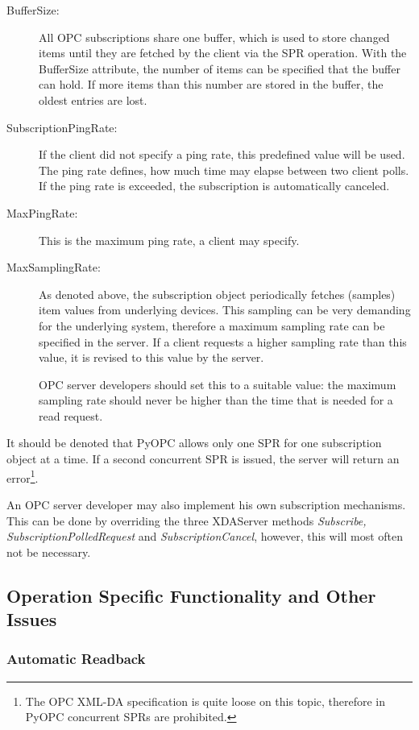 \begin{description}
\item[BufferSize:] All OPC subscriptions share one buffer, which is
used to store changed items until they are fetched by the client via
the SPR operation. With the BufferSize attribute, the number of items
can be specified that the buffer can hold. If more items than this
number are stored in the buffer, the oldest entries are lost.
\item[SubscriptionPingRate:] If the client did not specify a ping
rate, this predefined value will be used. The ping rate defines, how
much time may elapse between two client polls. If the ping rate is
exceeded, the subscription is automatically canceled.
\item[MaxPingRate:] This is the maximum ping rate, a client may specify.
\item[MaxSamplingRate:] As denoted above, the subscription object
periodically fetches (samples) item values from underlying devices.
This sampling can be very demanding for the underlying system,
therefore a maximum sampling rate can be specified in the server. If a
client requests a higher sampling rate than this value, it is revised
to this value by the server.

OPC server developers should set this to a suitable value: the maximum
sampling rate should never be higher than the time that is needed for
a read request.
\end{description}

It should be denoted that PyOPC allows only one SPR for one
subscription object at a time. If a second concurrent SPR is issued,
the server will return an error\footnote{The OPC XML-DA specification
is quite loose on this topic, therefore in PyOPC concurrent SPRs are
prohibited.}.

An OPC server developer may also implement his own subscription
mechanisms. This can be done by overriding the three XDAServer methods
{\sl Subscribe, SubscriptionPolledRequest} and {\sl
SubscriptionCancel}, however, this will most often not be necessary.

\subsection{Operation Specific Functionality and Other Issues}

\subsubsection*{Automatic Readback}

